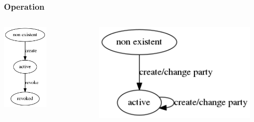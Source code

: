 \documentclass[8pt]{beamer}
\begin{document}
\begin{frame}[fragile]
\frametitle{Operation}
\begin{columns}
\begin{column}{0.3\textwidth}
\includegraphics[width=0.5\textwidth]{identity_state.png}
\end{column}
\begin{column}{0.3\textwidth}
\includegraphics[width=1\textwidth]{party_state.png}
\end{column}
\end{columns}


\end{frame}
\end{document}
